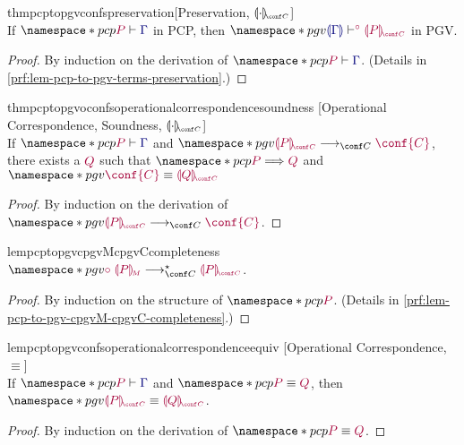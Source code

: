 \documentclass[main.tex]{subfiles}
\begin{document}
\begin{restatabletheorem}{thmpcptopgvconfspreservation}[Preservation, $\cpgvC{\cdot}$]
  \label{thm:pcp-to-pgv-confs-preservation}
  \hfill\\%
  If $\pcp{\seq{P}{\ty{\Gamma}}}$ in PCP,
  then $\pgv{\cseq[\child]{\ty{\cpgvT{\Gamma}}}{\cpgvC{P}}}$ in PGV.
\end{restatabletheorem}
\begin{proof}
  By induction on the derivation of $\pcp{\seq{P}{\ty{\Gamma}}}$.
  (Details in \cref{prf:lem-pcp-to-pgv-terms-preservation}.)
\end{proof}

\begin{restatabletheorem}{thmpcptopgvoconfsoperationalcorrespondencesoundness}%
  [Operational Correspondence, Soundness, $\cpgvC{\cdot}$]
  \label{thm:pcp-to-pgv-confs-operational-correspondence-soundness}
  \hfill\\%
  If $\pcp{\seq{P}{\ty{\Gamma}}}$ and $\pgv{\tm{\cpgvC{P}}\cred\tm{\conf{C}}}$,
  there exists a $\tm{Q}$ such that $\pcp{\tm{P}\red\tm{Q}}$ and $\pgv{\tm{\conf{C}}\equiv\tm{\cpgvC{Q}}}$
\end{restatabletheorem}
\begin{proof}
  By induction on the derivation of $\pgv{\tm{\cpgvC{P}}\cred\tm{\conf{C}}}$.
  \admit
\end{proof}

\begin{restatablelemma}{lempcptopgvcpgvMcpgvCcompleteness}
  \label{lem:pcp-to-pgv-cpgvM-cpgvC-completeness}
  $\pgv{\tm{\child\;\cpgvM{P}}\cred^\star\tm{\cpgvC{P}}}$.
\end{restatablelemma}
\begin{proof}
  By induction on the structure of $\pcp{\tm{P}}$.
  (Details in \cref{prf:lem-pcp-to-pgv-cpgvM-cpgvC-completeness}.)
\end{proof}

\begin{restatablelemma}{lempcptopgvconfsoperationalcorrespondenceequiv}%
  [Operational Correspondence, $\equiv$]
  \hfill\\%
  \label{lem:pcp-to-pgv-confs-operational-correspondence-equiv}
  If $\pcp{\seq{P}{\ty{\Gamma}}}$ and $\pcp{\tm{P}\equiv\tm{Q}}$,
  then $\pgv{\tm{\cpgvC{P}}\equiv\tm{\cpgvC{Q}}}$.
\end{restatablelemma}
\begin{proof}
  By induction on the derivation of $\pcp{\tm{P}\equiv\tm{Q}}$.
  \admit
\end{proof}
\end{document}
